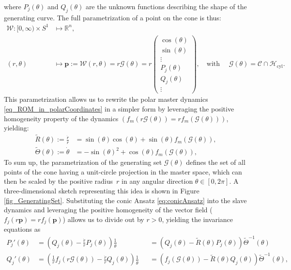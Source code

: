 \documentclass[a4paper,9pt,parskip=half,english]{article}
\theoremstyle{plain}
\theoremstyle{definition}
\newcommand{\vp}{\mathbf p}
\begin{document}
where $P_j(\theta)$ and $Q_j(\theta)$ are the unknown functions describing the shape of the generating curve. The full parametrization of a point on the cone is thus:
\begin{equation}\label{eq:cone_param}
	\begin{aligned} \mathcal{W} : [0, \infty) \times S^1 &\mapsto \mathbb{R}^{n} , \\ (r,\theta) &\mapsto \vp := \mathcal{W}(r,\theta) = r \mathcal{G}(\theta) = r \begin{pmatrix} \cos(\theta) \\ \sin(\theta) \\  \vdots \\ P_j(\theta) \\ Q_j(\theta) \\ \vdots \end{pmatrix} , \quad \mbox{with } \quad \mathcal{G}(\theta) = \mathcal{C} \cap \mathcal{H}_{\textrm{cyl}} . \end{aligned}
\end{equation}
This parametrization allows us to rewrite the polar master dynamics \eqref{eq_ROM_in_polarCoordinates} in a simpler form by leveraging the positive homogeneity property of the dynamics $(f_m(r\mathcal{G}(\theta))=r f_m(\mathcal{G}(\theta)))$, yielding:
\begin{equation}\label{eq_ROM_in_polarCoordinates_without_r}
	\begin{aligned} \tilde{R}(\theta) := \frac{\dot{r}}{r} &= \sin(\theta) \cos(\theta) + \sin(\theta) f_m(\mathcal{G}(\theta)), \\ \tilde{\Theta}(\theta) := \dot{\theta} &= - \sin(\theta)^2 + \cos(\theta) f_m(\mathcal{G}(\theta)), \end{aligned}
\end{equation}
To sum up, the parametrization of the generating set $\mathcal{G}(\theta)$ defines the set of all points of the cone having a unit-circle projection in the master space, which can then be scaled by the positive radius~$r$ in any angular direction $\theta \in [0, 2\pi]$. A three-dimensional sketch representing this idea is shown in Figure \ref{fig_GeneratingSet}.
Substituting the conic Ansatz \eqref{eq:conicAnsatz} into the slave dynamics and leveraging the positive homogeneity of the vector field ($f_j(r\vp) = r f_j(\vp)$) allows us to divide out by $r>0$, yielding the invariance equations as
\begin{equation}\label{eq:geometryODE}
\begin{aligned} P_j'(\theta) &= (Q_j(\theta) - \frac{\dot{r}}{r} P_j(\theta) ) \frac{1}{\dot{\theta}} &&=  (Q_j(\theta) - \tilde{R}(\theta) P_j(\theta) ) \tilde{\Theta}^{-1}(\theta)  \\ Q_j'(\theta) &= (\frac{1}{r}f_j(r \mathcal{G}(\theta)) - \frac{\dot{r}}{r} Q_j(\theta) ) \frac{1}{\dot{\theta}} &&= (f_j(\mathcal{G}(\theta)) - \tilde{R}(\theta) Q_j(\theta) )\tilde{\Theta}^{-1}(\theta) ,
\end{aligned} 
\end{equation}
\end{document}
